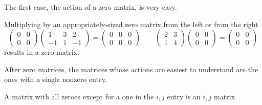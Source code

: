 The first case, the action of a zero matrix, is very easy.

\begin{example}
Multiplying by an appropriately-sized zero matrix
from the left or from the right
\begin{equation*}
    \begin{pmatrix}
       0  &0  \\
       0  &0
    \end{pmatrix}
    \begin{pmatrix}
       1  &3  &2   \\
      -1  &1  &-1
    \end{pmatrix}
  =
    \begin{pmatrix}
       0  &0  &0   \\
       0  &0  &0
    \end{pmatrix}
    \qquad
    \begin{pmatrix}
       2  &3  \\
       1  &4
    \end{pmatrix}
    \begin{pmatrix}
       0  &0  \\
       0  &0
    \end{pmatrix}
  =
    \begin{pmatrix}
       0  &0  \\
       0  &0
    \end{pmatrix}
\end{equation*}
results in a zero matrix.
\end{example}

After zero matrices, the matrices whose actions are easiest to understand
are the ones with a single nonzero entry.

\begin{definition}
A matrix with all zeroes except for a one in the \( i,j \) entry
is an \( i,j \)  
matrix.
\end{definition}

